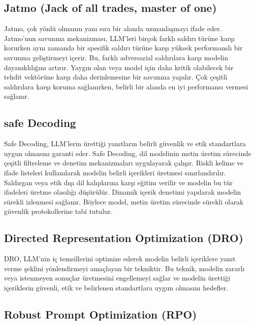 \newpage

\subsection{Jatmo (Jack of all trades, master of one)}

Jatmo, çok yönlü olmanın yanı sıra bir alanda uzmanlaşmayı ifade eder. Jatmo'nun savunma mekanizması, LLM'leri birçok farklı saldırı türüne karşı korurken aynı zamanda bir spesifik saldırı türüne karşı yüksek performanslı bir savunma geliştirmeyi içerir. Bu, farklı adversarial saldırılara karşı modelin dayanıklılığını artırır. Yaygın olan veya model için daha kritik olabilecek bir tehdit vektörüne karşı daha derinlemesine bir savunma yapılır. Çok çeşitli saldırılara karşı koruma sağlanırken, belirli bir alanda en iyi performansı vermesi sağlanır. 

\newpage

\subsection{safe Decoding}

Safe Decoding, LLM'lerin ürettiği yanıtların belirli güvenlik ve etik standartlara uygun olmasını garanti eder. Safe Decoding, dil modelinin metin üretim sürecinde çeşitli filtreleme ve denetim mekanizmaları uygulayarak çalışır. Riskli kelime ve ifade listeleri kullanılarak modelin belirli içerikleri üretmesi sınırlandırılır. Saldırgan veya etik dışı dil kalıplarına karşı eğitim verilir ve modelin bu tür ifadeleri üretme olasılığı düşürülür. Dinamik içerik denetimi yapılarak modelin sürekli izlenmesi sağlanır. Böylece model, metin üretim sürecinde sürekli olarak güvenlik protokollerine tabi tutulur.

\newpage

\subsection{Directed Representation Optimization (DRO)}

DRO, LLM'nin iç temsillerini optimize ederek modelin belirli içeriklere yanıt verme şeklini yönlendirmeyi amaçlayan bir tekniktir. Bu teknik, modelin zararlı veya istenmeyen sonuçlar üretmesini engellemeyi sağlar ve modelin ürettiği içeriklerin güvenli, etik ve belirlenen standartlara uygun olmasını hedefler.

\newpage

\subsection{Robust Prompt Optimization (RPO)}

